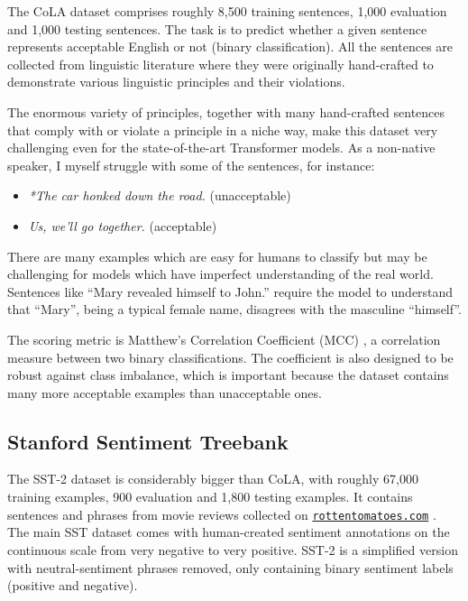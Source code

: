 \documentclass[bsc,frontabs,twoside,singlespacing,parskip,deptreport]{infthesis}
\newcommand\rurl[1]{%
  \href{https://#1}{\nolinkurl{#1}}%
}
\begin{document}
{{{      The CoLA dataset \citep{CoLA-paper} comprises roughly 8,500 training sentences, 1,000 evaluation and 1,000 testing sentences.
      The task is to predict whether a given sentence represents acceptable English or not (binary classification).
      All the sentences are collected from linguistic literature where they were originally hand-crafted to demonstrate various linguistic principles and their violations.
      
      The enormous variety of principles, together with many hand-crafted sentences that comply with or violate a principle in a niche way, make this dataset very challenging even for the state-of-the-art Transformer models. 
      As a non-native speaker, I myself struggle with some of the sentences, for instance:
      \begin{itemize}
        \item \textit{*The car honked down the road.} (unacceptable)
        \item \textit{Us, we'll go together.} (acceptable)
      \end{itemize}

      There are many examples which are easy for humans to classify but may be challenging for models which have imperfect understanding of the real world. Sentences like ``Mary revealed himself to John.'' require the model to understand that ``Mary'', being a typical female name, disagrees with the masculine ``himself''.
      
      The scoring metric is Matthew's Correlation Coefficient (MCC) \citep{Matthews_1975}, a correlation measure between two binary classifications. The coefficient is also designed to be robust against class imbalance, which is important because the dataset contains many more acceptable examples than unacceptable ones.
    }

    \subsection{Stanford Sentiment Treebank}{
      \label{sec:datasets-SST-2}

      The SST-2 dataset \citep{SST-paper} is considerably bigger than CoLA, with roughly 67,000 training examples, 900 evaluation and 1,800 testing examples. It contains sentences and phrases from movie reviews collected on \rurl{rottentomatoes.com}. The main SST dataset comes with human-created sentiment annotations on the continuous scale from very negative to very positive. SST-2 is a simplified version with neutral-sentiment phrases removed, only containing binary sentiment labels (positive and negative).

}}}
\end{document}
